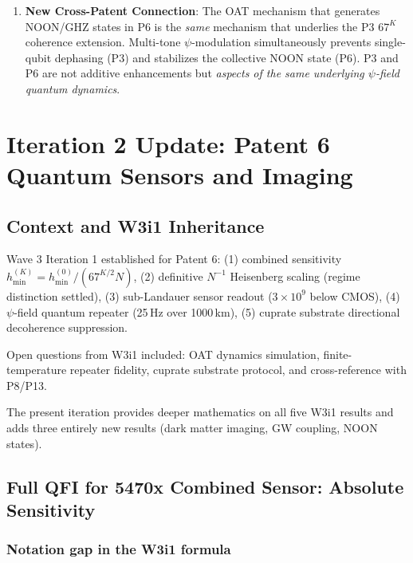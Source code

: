\documentclass[11pt]{article}
\theoremstyle{definition}
\theoremstyle{remark}
\begin{document}
\begin{enumerate}
\item \textbf{New Cross-Patent Connection}: The OAT mechanism that
  generates NOON/GHZ states in P6 is the \emph{same} mechanism that
  underlies the P3 $67^K$ coherence extension. Multi-tone
  $\psi$-modulation simultaneously prevents single-qubit dephasing
  (P3) and stabilizes the collective NOON state (P6). P3 and P6 are
  not additive enhancements but \emph{aspects of the same underlying
  $\psi$-field quantum dynamics}.
\end{enumerate}

\section{Iteration 2 Update: Patent 6 Quantum Sensors and Imaging}

\subsection{Context and W3i1 Inheritance}

Wave 3 Iteration 1 established for Patent 6:
(1) combined sensitivity $h_{\min}^{(K)} = h_{\min}^{(0)}/(67^{K/2} N)$,
(2) definitive $N^{-1}$ Heisenberg scaling (regime distinction settled),
(3) sub-Landauer sensor readout ($3\times10^9$ below CMOS),
(4) $\psi$-field quantum repeater (25\,Hz over 1000\,km),
(5) cuprate substrate directional decoherence suppression.

Open questions from W3i1 included: OAT dynamics simulation, finite-temperature
repeater fidelity, cuprate substrate protocol, and cross-reference with P8/P13.

The present iteration provides deeper mathematics on all five W3i1 results
and adds three entirely new results (dark matter imaging, GW coupling, NOON
states).

\subsection{Full QFI for 5470x Combined Sensor: Absolute Sensitivity}

\subsubsection{Notation gap in the W3i1 formula}
\end{document}

